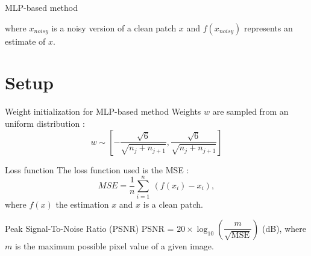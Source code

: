 \documentclass[8pt]{beamer}
\begin{document}
\begin{frame}{MLP-based method}
\begin{figure}[h]
\begin{minipage}[c]{9.5cm}
{
}%
\end{minipage}%
\end{figure}

\vspace{7pt}

where $x_{noisy}$ is a noisy version of a clean patch $x$ and $f(x_{noisy})$ represents an estimate of $x$.

\end{frame}

\section{Setup}

\begin{frame}
\begin{block}{Weight initialization for MLP-based method}
Weights $w$ are sampled from an uniform distribution :  \\%
$$w \sim \left[-\frac{\sqrt{6}}{\sqrt{n_j + n_{j+1}}}, \frac{\sqrt{6}}{\sqrt{n_j + n_{j+1}}}\right]$$ 
\end{block}



\begin{block}{Loss function}
The loss function used is the MSE : $$MSE = \frac{1}{n} \sum_{i=1}^{n} \ (f(x_i)-x_i),$$ where $f(x)$ the estimation $x$ and $x$ is a clean patch.
\end{block}


\begin{block}{Peak Signal-To-Noise Ratio (PSNR)}
PSNR = $20 \times \log_{10}\left(\dfrac{m}{\sqrt{\mathrm{MSE}}} \right)$ (dB), where $m$ is the maximum possible pixel value of a given image.
\end{block}
\end{frame}
\end{document}
